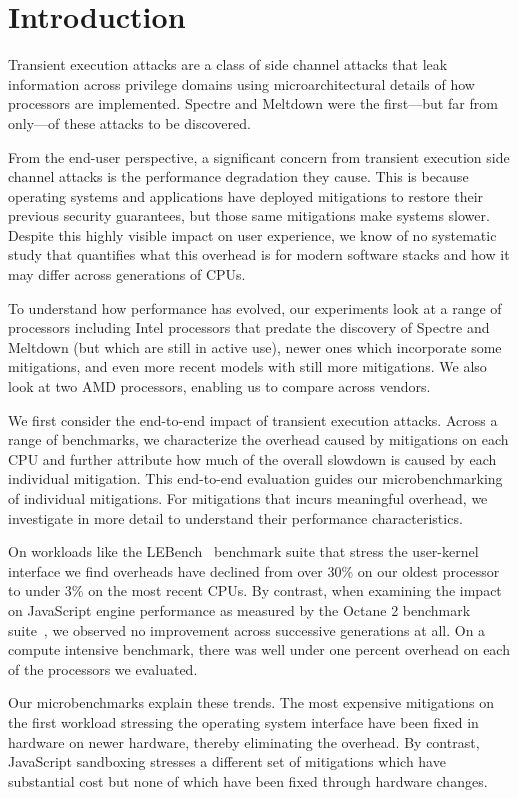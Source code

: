 \section{Introduction}
Transient execution attacks are a class of side channel attacks that leak information across privilege domains using microarchitectural details of how processors are implemented.
Spectre and Meltdown were the first---but far from only---of these attacks to be discovered.

From the end-user perspective, a significant concern from transient execution side channel attacks is the performance degradation they cause.
This is because operating systems and applications have deployed mitigations to restore their previous security guarantees, but those same mitigations make systems slower.
Despite this highly visible impact on user experience, we know of no systematic study that quantifies what this overhead is for modern software stacks and how it may differ across generations of CPUs.

To understand how performance has evolved, our experiments look at a range of processors including Intel processors that predate the discovery of Spectre and Meltdown (but which are still in active use), newer ones which incorporate some mitigations, and even more recent models with still more mitigations.
We also look at two AMD processors, enabling us to compare across vendors.

We first consider the end-to-end impact of transient execution attacks.
Across a range of benchmarks, we characterize the overhead caused by mitigations on each CPU and further attribute how much of the overall slowdown is caused by each individual mitigation.
This end-to-end evaluation guides our microbenchmarking of individual mitigations.
For mitigations that incurs meaningful overhead, we investigate in more detail to understand their performance characteristics.

On workloads like the LEBench~\cite{ren:lebench} benchmark suite that stress the user-kernel interface we find overheads have declined from over 30\% on our oldest processor to under 3\% on the most recent CPUs.
By contrast, when examining the impact on JavaScript engine performance as measured by the Octane 2 benchmark suite~\cite{google:octane2}, we observed no improvement across successive generations at all.
On a compute intensive benchmark, there was well under one percent overhead on each of the processors we evaluated.

Our microbenchmarks explain these trends.
The most expensive mitigations on the first workload stressing the operating system interface have been fixed in hardware on newer hardware, thereby eliminating the overhead.
By contrast, JavaScript sandboxing stresses a different set of mitigations which
have substantial cost but none of which have been fixed through hardware changes.

